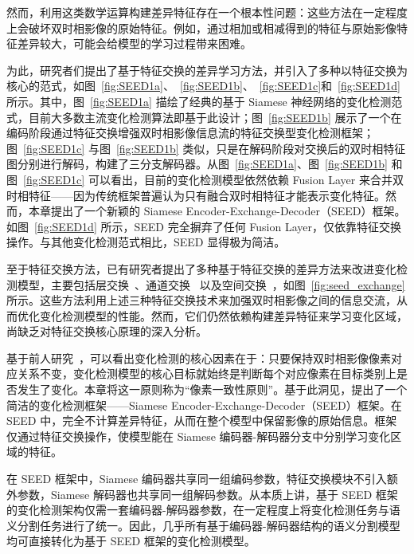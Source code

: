 然而，利用这类数学运算构建差异特征存在一个根本性问题：这些方法在一定程度上会破坏双时相影像的原始特征。例如，通过相加或相减得到的特征与原始影像特征差异较大，可能会给模型的学习过程带来困难。

为此，研究者们提出了基于特征交换的差异学习方法，并引入了多种以特征交换为核心的范式，如图~\ref{fig:SEED1a}、~\ref{fig:SEED1b}、~\ref{fig:SEED1c}和~\ref{fig:SEED1d}所示。其中，图~\ref{fig:SEED1a} 描绘了经典的基于 Siamese 神经网络的变化检测范式，目前大多数主流变化检测算法即基于此设计；图~\ref{fig:SEED1b} 展示了一个在编码阶段通过特征交换增强双时相影像信息流的特征交换型变化检测框架；图~\ref{fig:SEED1c} 与图~\ref{fig:SEED1b} 类似，只是在解码阶段对交换后的双时相特征图分别进行解码，构建了三分支解码器。从图~\ref{fig:SEED1a}、图~\ref{fig:SEED1b} 和图~\ref{fig:SEED1c} 可以看出，目前的变化检测模型依然依赖 Fusion Layer 来合并双时相特征——因为传统框架普遍认为只有融合双时相特征才能表示变化特征。然而，本章提出了一个新颖的 Siamese Encoder-Exchange-Decoder（SEED）框架。如图~\ref{fig:SEED1d} 所示，SEED 完全摒弃了任何 Fusion Layer，仅依靠特征交换操作。与其他变化检测范式相比，SEED 显得极为简洁。

至于特征交换方法，已有研究者提出了多种基于特征交换的差异方法来改进变化检测模型，主要包括层交换~\cite{dong_efficientcd_2024}、通道交换~\cite{Fang2022ChangerFI,zhao_exchanging_2023} 以及空间交换~\cite{Fang2022ChangerFI,zhao_exchanging_2023}，如图~\ref{fig:seed_exchange} 所示。这些方法利用上述三种特征交换技术来加强双时相影像之间的信息交流，从而优化变化检测模型的性能。然而，它们仍然依赖构建差异特征来学习变化区域，尚缺乏对特征交换核心原理的深入分析。

基于前人研究~\cite{dong_efficientcd_2024,Fang2022ChangerFI,zhao_exchanging_2023}，可以看出变化检测的核心因素在于：只要保持双时相影像像素对应关系不变，变化检测模型的核心目标就始终是判断每个对应像素在目标类别上是否发生了变化。本章将这一原则称为“像素一致性原则”。基于此洞见，提出了一个简洁的变化检测框架——Siamese Encoder-Exchange-Decoder（SEED）框架。在 SEED 中，完全不计算差异特征，从而在整个模型中保留影像的原始信息。框架仅通过特征交换操作，使模型能在 Siamese 编码器-解码器分支中分别学习变化区域的特征。

在 SEED 框架中，Siamese 编码器共享同一组编码参数，特征交换模块不引入额外参数，Siamese 解码器也共享同一组解码参数。从本质上讲，基于 SEED 框架的变化检测架构仅需一套编码器-解码器参数，在一定程度上将变化检测任务与语义分割任务进行了统一。因此，几乎所有基于编码器-解码器结构的语义分割模型均可直接转化为基于 SEED 框架的变化检测模型。

